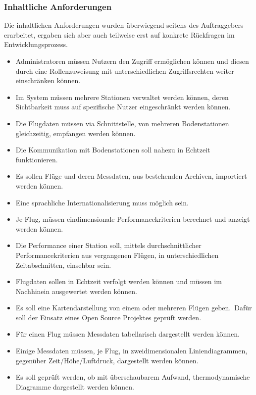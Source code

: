 \subsubsection{Inhaltliche Anforderungen}
Die inhaltlichen Anforderungen wurden überwiegend seitens des Auftraggebers erarbeitet, ergaben sich aber auch teilweise erst auf konkrete Rückfragen im Entwicklungsprozess.
\begin{itemize}
    \item Administratoren müssen Nutzern den Zugriff ermöglichen können und diesen durch eine Rollenzuweisung mit unterschiedlichen Zugriffsrechten weiter einschränken können.
    \item Im System müssen mehrere Stationen verwaltet werden können, deren Sichtbarkeit muss auf spezifische Nutzer eingeschränkt werden können.
    \item Die Flugdaten müssen via Schnittstelle, von mehreren Bodenstationen gleichzeitig, empfangen werden können.
    \item Die Kommunikation mit Bodenstationen soll nahezu in Echtzeit funktionieren.
    \item Es sollen Flüge und deren Messdaten, aus bestehenden Archiven, importiert werden können.
    \item Eine sprachliche Internationalisierung muss möglich sein.
    \item Je Flug, müssen eindimensionale Performancekriterien berechnet und anzeigt werden können.
    \item Die Performance einer Station soll, mittels durchschnittlicher Performancekriterien aus vergangenen Flügen, in unterschiedlichen Zeitabschnitten, einsehbar sein.
    \item Flugdaten sollen in Echtzeit verfolgt werden können und müssen im Nachhinein ausgewertet werden können.
    \item Es soll eine Kartendarstellung von einem oder mehreren Flügen geben.\ Dafür soll der Einsatz eines Open Source Projektes\cite{sondehub-tracker} geprüft werden.
    \item Für einen Flug müssen Messdaten tabellarisch dargestellt werden können.
    \item Einige Messdaten müssen, je Flug, in zweidimensionalen Liniendiagrammen, gegenüber Zeit/Höhe/Luftdruck, dargestellt werden können.
    \item Es soll geprüft werden, ob mit überschaubarem Aufwand, thermodynamische Diagramme dargestellt werden können.
\end{itemize}
\newpage

